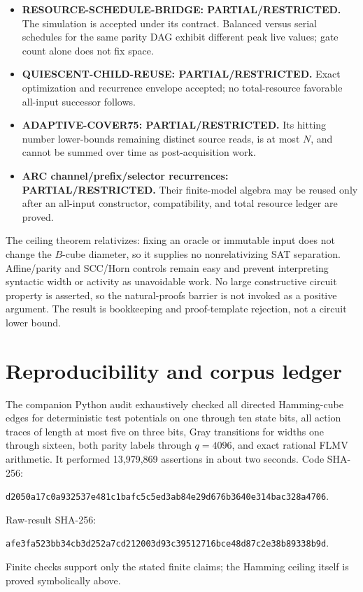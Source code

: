 \documentclass[11pt]{article}
\begin{document}
\begin{itemize}[leftmargin=*]
\item \textbf{RESOURCE-SCHEDULE-BRIDGE: PARTIAL/RESTRICTED.}  The simulation is accepted under its contract.  Balanced versus serial schedules for the same parity DAG exhibit different peak live values; gate count alone does not fix space.
\item \textbf{QUIESCENT-CHILD-REUSE: PARTIAL/RESTRICTED.}  Exact optimization and recurrence envelope accepted; no total-resource favorable all-input successor follows.
\item \textbf{ADAPTIVE-COVER75: PARTIAL/RESTRICTED.}  Its hitting number lower-bounds remaining distinct source reads, is at most $N$, and cannot be summed over time as post-acquisition work.
\item \textbf{ARC channel/prefix/selector recurrences: PARTIAL/RESTRICTED.}  Their finite-model algebra may be reused only after an all-input constructor, compatibility, and total resource ledger are proved.
\end{itemize}

The ceiling theorem relativizes: fixing an oracle or immutable input does not change the $B$-cube diameter, so it supplies no nonrelativizing SAT separation.  Affine/parity and SCC/Horn controls remain easy and prevent interpreting syntactic width or activity as unavoidable work.  No large constructive circuit property is asserted, so the natural-proofs barrier is not invoked as a positive argument.  The result is bookkeeping and proof-template rejection, not a circuit lower bound.

\section{Reproducibility and corpus ledger}

The companion Python audit exhaustively checked all directed Hamming-cube edges for deterministic test potentials on one through ten state bits, all action traces of length at most five on three bits, Gray transitions for widths one through sixteen, both parity labels through $q=4096$, and exact rational FLMV arithmetic.  It performed 13,979,869 assertions in about two seconds.  Code SHA-256:
\begin{center}
\texttt{d2050a17c0a932537e481c1bafc5c5ed3ab84e29d676b3640e314bac328a4706}.
\end{center}
Raw-result SHA-256:
\begin{center}
\texttt{afe3fa523bb34cb3d252a7cd212003d93c39512716bce48d87c2e38b89338b9d}.
\end{center}
Finite checks support only the stated finite claims; the Hamming ceiling itself is proved symbolically above.
\end{document}

